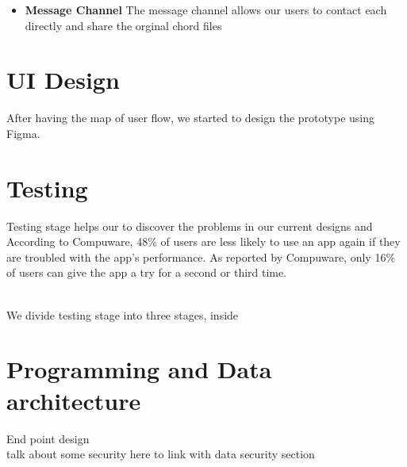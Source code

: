 \begin{itemize}
\item \textbf{Message Channel}
The message channel allows our users to contact each directly and share the orginal chord files 

\end{itemize}




\section{UI Design}
After having the map of user flow, we started to design the prototype using Figma.


\section{Testing}
Testing stage helps our to discover the problems in our current designs and 
According to Compuware, 48\% of users are less likely to use an app again if they are troubled with the app’s performance.
As reported by Compuware, only 16\% of users can give the app a try for a second or third time. 

\\We divide testing stage into three stages, inside 

\section{Programming and Data architecture}
End point design
\\talk about some security here to link with data security section






